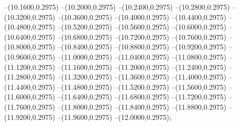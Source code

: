 {	--(10.1600,0.2975)
	--(10.2000,0.2975)
	--(10.2400,0.2975)
	--(10.2800,0.2975)
	--(10.3200,0.2975)
	--(10.3600,0.2975)
	--(10.4000,0.2975)
	--(10.4400,0.2975)
	--(10.4800,0.2975)
	--(10.5200,0.2975)
	--(10.5600,0.2975)
	--(10.6000,0.2975)
	--(10.6400,0.2975)
	--(10.6800,0.2975)
	--(10.7200,0.2975)
	--(10.7600,0.2975)
	--(10.8000,0.2975)
	--(10.8400,0.2975)
	--(10.8800,0.2975)
	--(10.9200,0.2975)
	--(10.9600,0.2975)
	--(11.0000,0.2975)
	--(11.0400,0.2975)
	--(11.0800,0.2975)
	--(11.1200,0.2975)
	--(11.1600,0.2975)
	--(11.2000,0.2975)
	--(11.2400,0.2975)
	--(11.2800,0.2975)
	--(11.3200,0.2975)
	--(11.3600,0.2975)
	--(11.4000,0.2975)
	--(11.4400,0.2975)
	--(11.4800,0.2975)
	--(11.5200,0.2975)
	--(11.5600,0.2975)
	--(11.6000,0.2975)
	--(11.6400,0.2975)
	--(11.6800,0.2975)
	--(11.7200,0.2975)
	--(11.7600,0.2975)
	--(11.8000,0.2975)
	--(11.8400,0.2975)
	--(11.8800,0.2975)
	--(11.9200,0.2975)
	--(11.9600,0.2975)
	--(12.0000,0.2975);
}
